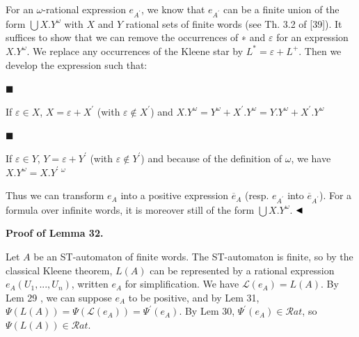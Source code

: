 \documentclass[10pt,a4paper]{article}
\begin{document}
 
For an $\omega$-rational expression $e_{A^{\prime}}$, we know that $e_{A^{\prime}}$ can be a finite union of the form $\bigcup X.Y^{\omega}$ with $X$ and $Y$ rational sets of finite words (see Th. 3.2 of [39]). It suffices to show that we can remove the occurrences of ∗ and $\varepsilon$ for an expression $X.Y^{\omega}$. We replace any occurrences of the Kleene star by $L^{*}=\varepsilon+L^{+}$. Then we develop the expression such that:\par
  
\par\noindent  $\blacksquare$ 
 
If $\varepsilon\in X$, $X=\varepsilon+X^{\prime}$ (with $\varepsilon\not\in X^{\prime}$) and $X.Y^{\omega}=Y^{\omega}+X^{\prime}.Y^{\omega}=Y.Y^{\omega}+X^{\prime}.Y^{\omega}$\par
 
 
 
\par\noindent  $\blacksquare$ 
 
If $\varepsilon\in Y$, $Y=\varepsilon+Y^{\prime}$ (with $\varepsilon\not\in Y^{\prime}$) and because of the definition of \ensuremath{\omega}, we have $X.Y^{\omega}=X.Y^{\prime}\ {}^{\omega}$\par
 
 
  
Thus we can transform $e_{A}$ into a positive expression $\overline{e}_{A}$ (resp. $e_{A^{\prime}}$ into $\overline{e}_{A^{\prime}}$). For a formula over infinite words, it is moreover still of the form $\bigcup X.Y^{\omega}$. $\hfill\blacktriangleleft$\par
 
 
 
 
\par\medskip\noindent\textbf{Proof of Lemma 32.}\par
 
 
Let $A$ be an ST-automaton of finite words. The ST-automaton is finite, so by the classical Kleene theorem, $L(A)$ can be represented by a rational expression $e_{A}(U_{1},...,U_{n})$, written $e_{A}$ for simplification. We have $\mathcal{L}(e_{A})=L(A)$. By Lem 29 , we can suppose $e_{A}$ to be positive, and by Lem 31, $\Psi(L(A))=\Psi(\mathcal{L}(e_{A}))=\Psi^{\prime}(e_{A})$. By Lem 30, $\Psi^{\prime}(e_{A})\in\mathcal{R}at$, so $\Psi(L(A))\in\mathcal{R}at$.\par
 
\end{document}

